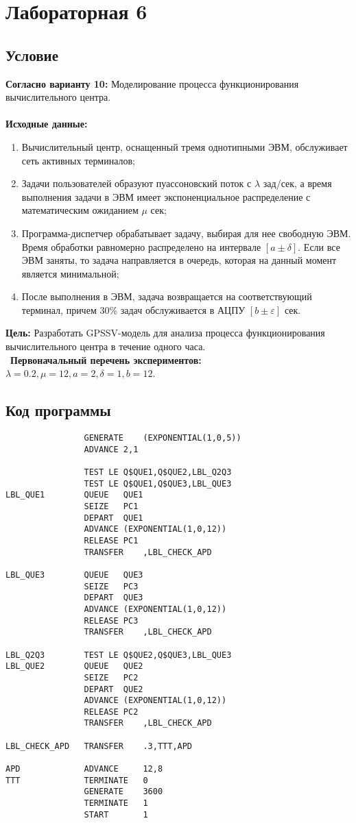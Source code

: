 \section{Лабораторная 6}

\subsection{Условие}

\textbf{Согласно варианту 10:}
Моделирование процесса функционирования вычислительного центра.\\
\\
\textbf{Исходные данные:}
\begin{enumerate}
	\item Вычислительный центр, оснащенный тремя однотипными ЭВМ, обслуживает сеть активных терминалов;
	\item Задачи пользователей образуют пуассоновский поток с $\lambda$ зад/сек, а время выполнения задачи в ЭВМ имеет экспоненциальное распределение с математическим ожиданием $\mu$ сек;
	\item Программа-диспетчер обрабатывает задачу, выбирая для нее свободную ЭВМ. Время обработки равномерно распределено на интервале $[a\pm\delta]$. Если все ЭВМ заняты, то задача направляется в очередь, которая на данный момент является минимальной;
	\item После выполнения в ЭВМ, задача возвращается на соответствующий терминал, причем 30\% задач обслуживается в АЦПУ $[b\pm\varepsilon]$ сек.
\end{enumerate}
\textbf{Цель:} Разработать GPSSV-модель для анализа процесса функционирования вычислительного центра в течение одного часа.\\
\
\textbf{Первоначальный перечень экспериментов:} $\lambda=0.2, \mu=12, a=2, \delta=1, b=12$.

\subsection{Код программы}

\begin{lstlisting}
				GENERATE	(EXPONENTIAL(1,0,5))
				ADVANCE	2,1

				TEST LE	Q$QUE1,Q$QUE2,LBL_Q2Q3
				TEST LE	Q$QUE1,Q$QUE3,LBL_QUE3
LBL_QUE1		QUEUE	QUE1
				SEIZE	PC1
				DEPART	QUE1
				ADVANCE	(EXPONENTIAL(1,0,12))
				RELEASE	PC1
				TRANSFER	,LBL_CHECK_APD

LBL_QUE3		QUEUE	QUE3
				SEIZE	PC3
				DEPART	QUE3
				ADVANCE	(EXPONENTIAL(1,0,12))
				RELEASE	PC3
				TRANSFER	,LBL_CHECK_APD

LBL_Q2Q3		TEST LE	Q$QUE2,Q$QUE3,LBL_QUE3
LBL_QUE2		QUEUE	QUE2
				SEIZE	PC2
				DEPART	QUE2
				ADVANCE	(EXPONENTIAL(1,0,12))
				RELEASE	PC2
				TRANSFER	,LBL_CHECK_APD

LBL_CHECK_APD	TRANSFER	.3,TTT,APD

APD				ADVANCE		12,8
TTT				TERMINATE	0
				GENERATE	3600
				TERMINATE	1
	    		START		1

\end{lstlisting}
